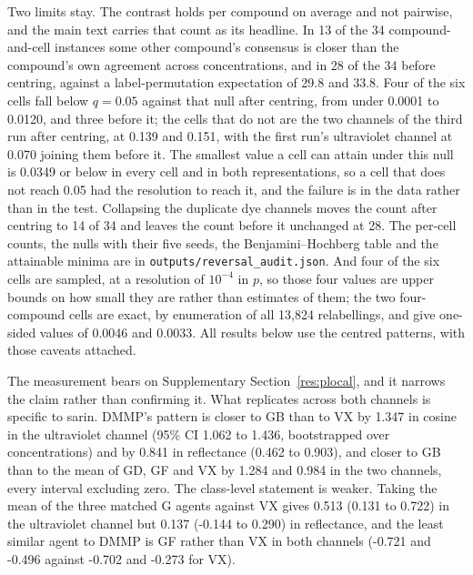 \documentclass[journal=jacsat,manuscript=suppinfo,margin=1in]{achemso}
\begin{document}
Two limits stay. The contrast holds per compound on average and not pairwise,
and the main text carries that count as its headline. In 13 of the 34
compound-and-cell instances some other compound's consensus is closer than the
compound's own agreement across concentrations, and in 28 of the 34 before
centring, against a label-permutation expectation of 29.8 and 33.8. Four of the
six cells fall below $q = 0.05$ against that null after centring, from under
0.0001 to 0.0120, and three before it; the cells that do not are the two
channels of the third run after centring, at 0.139 and 0.151, with the first
run's ultraviolet channel at 0.070 joining them before it. The smallest value a
cell can attain under this null is 0.0349 or below in every cell and in both
representations, so a cell that does not reach 0.05 had the resolution to reach
it, and the failure is in the data rather than in the test. Collapsing the
duplicate dye channels moves the count after centring to 14 of 34 and leaves
the count before it unchanged at 28. The per-cell counts, the nulls with their
five seeds, the Benjamini--Hochberg table and the attainable minima are in
\texttt{outputs/reversal\_audit.json}. %
And four of the six cells are
sampled, at a resolution of $10^{-4}$ in $p$, so those four values are upper
bounds on how small they are rather than estimates of them; the two
four-compound cells are exact, by enumeration of all 13,824 relabellings, and
give one-sided values of 0.0046 and 0.0033. All results below use the centred patterns, with those caveats attached.


The measurement bears on Supplementary Section~\ref{res:plocal}, and it narrows the claim
rather than confirming it. What replicates across both channels is specific to
sarin. DMMP's pattern is closer to GB than to VX by 1.347 in cosine in the
ultraviolet channel (95\% CI 1.062 to 1.436, bootstrapped over concentrations)
and by 0.841 in reflectance (0.462 to 0.903), and closer to GB than to the mean
of GD, GF and VX by 1.284 and 0.984 in the two channels, every interval
excluding zero. The class-level statement is weaker. Taking the mean of the
three matched G agents against VX gives 0.513 (0.131 to 0.722) in the
ultraviolet channel but 0.137 (-0.144 to 0.290) in reflectance, and the least
similar agent to DMMP is GF rather than VX in both channels (-0.721 and -0.496
against -0.702 and -0.273 for VX).
\end{document}
